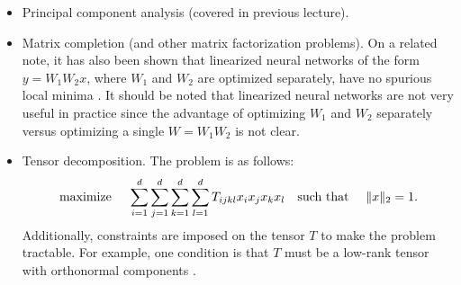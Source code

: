 \begin{itemize}
    \item Principal component analysis (covered in previous lecture).
    \item Matrix completion (and other matrix factorization problems). On a related note, it has also been shown that linearized neural networks of the form $y = W_1W_2x$, where $W_1$ and $W_2$ are optimized separately, have no spurious local minima \cite{baldi1989neural}. It should be noted that linearized neural networks are not very useful in practice since the advantage of optimizing $W_1$ and $W_2$ separately versus optimizing a single $W=W_1W_2$ is not clear.
    \item Tensor decomposition. The problem is as follows:
    \begin{align}
        \text{maximize }\quad \sum_{i=1}^d \sum_{j=1}^d \sum_{k=1}^d \sum_{l=1}^d T_{ijkl} x_ix_jx_kx_l \quad \text{such that } \quad \|x\|_2 = 1.
    \end{align}
    Additionally, constraints are imposed on the tensor $T$ to make the problem tractable. For example, one condition is that $T$ must be a low-rank tensor with orthonormal components \cite{ge2015}.
\end{itemize}